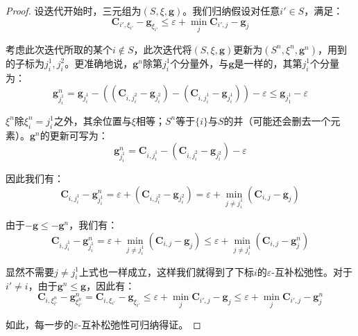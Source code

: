\documentclass[cn,10pt,math=newtx,citestyle=gb7714-2015,bibstyle=gb7714-2015]{elegantbook}
\begin{document}
\begin{proof}
设迭代开始时，三元组为$(S,\xi,\mathbf{g})$。我们归纳假设对任意$i'\in S$，满足：
\begin{equation*}
    \mathbf{C}_{i',\xi_{i'}} - \mathbf{g}_{\xi_{i'}}\leq \varepsilon + \min\limits_j \mathbf{C}_{i',j} - \mathbf{g}_j
\end{equation*}

考虑此次迭代所取的某个$i\notin S$，此次迭代将$(S,\xi,\mathbf{g})$更新为$(S^n,\xi^n,\mathbf{g}^n)$，用到的子标为$j_i^1,j_i^2$。更准确地说，$\mathbf{g}^n$除第$j_i^1$个分量外，与$\mathbf{g}$是一样的，其第$j_i^1$个分量为：
\begin{equation*}
    \mathbf{g}_{j_i^1}^n = \mathbf{g}_{j_i^1} - \left(  (\mathbf{C}_{i,j_i^2}-\mathbf{g}_{j_i^2})-(\mathbf{C}_{i,j_i^1}-\mathbf{g}_{j_i^1})\right) - \varepsilon \leq \mathbf{g}_{j_1^1} - \varepsilon
\end{equation*}

$\xi^n$除$\xi_i^n=j_i^1$之外，其余位置与$\xi$相等；$S^n$等于$\{i\}$与$S$的并（可能还会删去一个元素）。$\mathbf{g}^n$的更新可写为：
\begin{equation*}
    \mathbf{g}_{j_i^1}^n = \mathbf{C}_{i,j_i^1} - (\mathbf{C}_{i,j_i^2}-\mathbf{g}_{j_i^2}) - \varepsilon
\end{equation*}

因此我们有：
\begin{equation*}
    \mathbf{C}_{i,j_i^1}-\mathbf{g}_{j_i^1}^n=\varepsilon + (\mathbf{C}_{i,j_i^2}-\mathbf{g}_{j_i^2})=\varepsilon + \min\limits_{j\neq j_i^1} (\mathbf{C}_{i,j}-\mathbf{g}_j)
\end{equation*}

由于$-\mathbf{g}\leq -\mathbf{g}^n$，我们有：
\begin{equation*}
    \mathbf{C}_{i,j_i^1}-\mathbf{g}_{j_i^1}^n=\varepsilon + \min\limits_{j\neq j_i^1} (\mathbf{C}_{i,j}-\mathbf{g}_j) \leq \varepsilon + \min\limits_{j\neq j_i^1} (\mathbf{C}_{i,j}-\mathbf{g}_j^n)
\end{equation*}

显然不需要$j\neq j_i^1$上式也一样成立，这样我们就得到了下标$i$的$\varepsilon$-互补松弛性。对于$i'\neq i$，由于$\mathbf{g}^n\leq \mathbf{g}$，因此有：
\begin{equation*}
    \mathbf{C}_{i,\xi_{i'}^n}-\mathbf{g}_{\xi_{i'}^n}^n = \mathbf{C}_{i,\xi_{i'}}-\mathbf{g}_{\xi_{i'}} \leq \varepsilon + \min\limits_j \mathbf{C}_{i',j}-\mathbf{g}_j \leq \varepsilon + \min\limits_j \mathbf{C}_{i',j}-\mathbf{g}_j^n
\end{equation*}

如此，每一步的$\varepsilon$-互补松弛性可归纳得证。
\end{proof}
\end{document}
